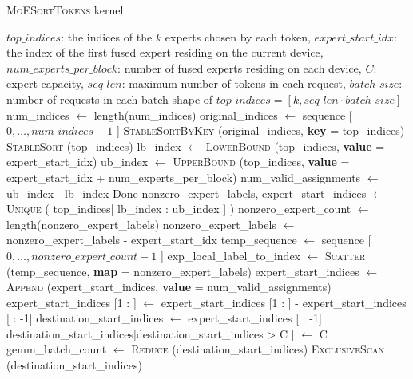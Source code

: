 \begin{algorithm}[H]
  \caption{\textsc{MoESortTokens} kernel}
  \label{alg:moe-sort-tokens}
  \small
  \begin{algorithmic}[1]
    \Ensure $top\_indices$: the indices of the $k$ experts chosen by each token, $expert\_start\_idx$: the index of the first fused expert residing on the current device, $num\_experts\_per\_block$: number of fused experts residing on each device, $C$: expert capacity, $seq\_len$: maximum number of tokens in each request, $batch\_size$: number of requests in each batch
    \Require shape of $top\_indices = [k, seq\_len \cdot batch\_size]$    
        \State num\_indices $\leftarrow$ length(num\_indices)
        \State original\_indices $\leftarrow$ sequence [ $0, \dots,  num\_indices -1 $ ]
        \State \textsc{StableSortByKey} (original\_indices, \textbf{key} = top\_indices)
        \State \textsc{StableSort} (top\_indices)
        \State lb\_index $\leftarrow$ \textsc{LowerBound} (top\_indices, \textbf{value} = expert\_start\_idx)
        \State ub\_index $\leftarrow$ \textsc{UpperBound} (top\_indices, \textbf{value} = expert\_start\_idx + num\_experts\_per\_block)
        \State num\_valid\_assignments $\leftarrow$ ub\_index - lb\_index
            \State Done
        \EndIf
        \State nonzero\_expert\_labels, expert\_start\_indices $\leftarrow$ \textsc{Unique} ( top\_indices[ lb\_index : ub\_index ]  )
        \State nonzero\_expert\_count $\leftarrow$ length(nonzero\_expert\_labels)
        \State nonzero\_expert\_labels $\leftarrow$ nonzero\_expert\_labels - expert\_start\_idx
        \State temp\_sequence $\leftarrow$ sequence [ $0, \dots,  nonzero\_expert\_count -1 $ ]
        \State exp\_local\_label\_to\_index $\leftarrow$ \textsc{Scatter} (temp\_sequence, \textbf{map} = nonzero\_expert\_labels)
        \State expert\_start\_indices $\leftarrow$ \textsc{Append} (expert\_start\_indices, \textbf{value} = num\_valid\_assignments)
        \State expert\_start\_indices [1 : ] $\leftarrow$  expert\_start\_indices [1 : ] - expert\_start\_indices [ : -1]
        \State destination\_start\_indices $\leftarrow$ expert\_start\_indices [ : -1]
        \State destination\_start\_indices[destination\_start\_indices > C ] $\leftarrow$ C
        \State gemm\_batch\_count $\leftarrow$ \textsc{Reduce} (destination\_start\_indices)
        \State \textsc{ExclusiveScan} (destination\_start\_indices)
    \EndProcedure
  \end{algorithmic}
\end{algorithm}

